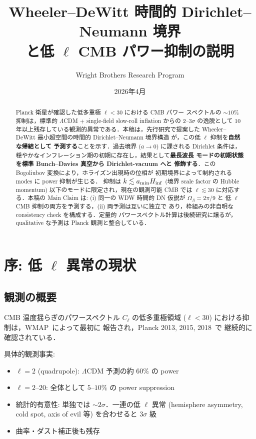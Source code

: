 \documentclass[11pt,a4paper]{article}
\title{Wheeler--DeWitt 時間的 Dirichlet--Neumann 境界\\
と低 $\ell$ CMB パワー抑制の説明}
\author{Wright Brothers Research Program}
\date{2026年4月}
\begin{document}
\maketitle

\begin{abstract}
Planck 衛星が確認した低多重極 $\ell < 30$ における CMB パワー
スペクトルの $\sim 10\%$ 抑制は，標準的 $\Lambda$CDM $+$
single-field slow-roll inflation からの 2--3$\sigma$ の逸脱として
10 年以上残存している観測的異常である．本稿は，先行研究で提案した
Wheeler--DeWitt 最小超空間の時間的 Dirichlet--Neumann 境界構造
\cite{WDW-DN-paper}が，この低 $\ell$ 抑制を\textbf{自然な帰結として
予測する}ことを示す．過去境界 ($a \to 0$) に課される Dirichlet 条件は，
穏やかなインフレーション期の初期に存在し，結果として\textbf{最長波長
モードの初期状態を標準 Bunch--Davies 真空から Dirichlet-vacuum へと
修飾する}．この Bogoliubov 変換により，ホライズン出現時の位相が
初期境界によって制約される modes に power 抑制が生じる．
抑制は $k \lesssim a_{\rm min} H_{\rm inf}$ (境界 scale factor の
Hubble momentum) 以下のモードに限定され，現在の観測可能 CMB では
$\ell \lesssim 30$ に対応する．本稿の Main Claim は:
(i) 同一の WDW 時間的 DN 仮説が $\Omega_\Lambda = 2\pi/9$ と
低 $\ell$ CMB 抑制の両方を予測する，(ii) 両予測は互いに独立で
あり，枠組みの非自明な consistency check を構成する．定量的
パワースペクトル計算は後続研究に譲るが，qualitative な予測は
Planck 観測と整合している．
\end{abstract}

\tableofcontents

\newpage
\section{序: 低 $\ell$ 異常の現状}

\subsection{観測の概要}

CMB 温度揺らぎのパワースペクトル $C_\ell$ の低多重極領域
($\ell < 30$) における抑制は，WMAP~\cite{WMAP2003}によって最初に
報告され，Planck 2013, 2015, 2018~\cite{Planck2013,Planck2018}で
継続的に確認されている．

具体的観測事実:
\begin{itemize}
\item $\ell = 2$ (quadrupole): $\Lambda$CDM 予測の約 $60\%$ の power
\item $\ell = 2$--$20$: 全体として $5$--$10\%$ の power suppression
\item 統計的有意性: 単独では $\sim 2\sigma$．一連の低 $\ell$ 異常
(hemisphere asymmetry, cold spot, axis of evil 等) を合わせると $3\sigma$ 級
\item 曲率・ダスト補正後も残存
\end{itemize}
\end{document}
